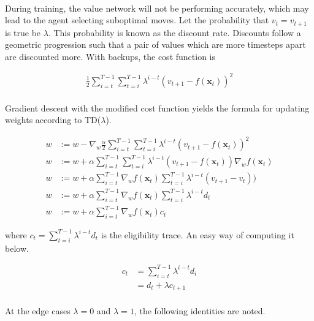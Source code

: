 \documentclass[12pt,a4paper]{book}
\begin{document}
\paragraph{} During training, the value network will not be performing accurately, which may lead to the agent selecting suboptimal moves. Let the probability that $v_{t} = v_{t+1}$ is true be $\lambda$. This probability is known as the discount rate. Discounts follow a geometric progression such that a pair of values which are more timesteps apart are discounted more. With backups, the cost function is

\begin{align*}
  \frac{1}{2} \sum_{i=t}^{T-1} \sum_{t=i}^{T-1} \lambda^{i-t} (v_{t+1} - f(\mathbf{x}_t))^2
\end{align*}

\paragraph{} Gradient descent with the modified cost function yields the formula for updating weights according to TD($\lambda$).

\begin{align*}
  w &:= w - \nabla_w \frac{\alpha}{2} \sum_{i=t}^{T-1} \sum_{t=i}^{T-1} \lambda^{i-t} (v_{t+1} - f(\mathbf{x}_t))^2\\
  w &:= w + \alpha \sum_{i=t}^{T-1} \sum_{t=i}^{T-1} \lambda^{i-t} (v_{t+1} - f(\mathbf{x}_t)) \nabla_w f(\mathbf{x}_t)\\
  w &:= w + \alpha \sum_{i=t}^{T-1} \nabla_w f(\mathbf{x}_t) \sum_{t=i}^{T-1} \lambda^{i-t} (v_{t+1} - v_t))\\
  w &:= w + \alpha \sum_{i=t}^{T-1} \nabla_w f(\mathbf{x}_t) \sum_{t=i}^{T-1} \lambda^{i-t} d_t\\
  w &:= w + \alpha \sum_{i=t}^{T-1} \nabla_w f(\mathbf{x}_t) c_t
\end{align*}


where $c_t = \sum_{t=i}^{T-1} \lambda^{i-t} d_t$ is the eligibility trace. An easy way of computing it below.

\begin{align*}
  c_{t} &= \sum_{i=t}^{T-1} \lambda^{i-t} d_{i} \\
        &= d_{t} + \lambda c_{t+1}
\end{align*}

\paragraph{} At the edge cases $\lambda = 0$ and $\lambda = 1$, the following identities are noted.
\end{document}
